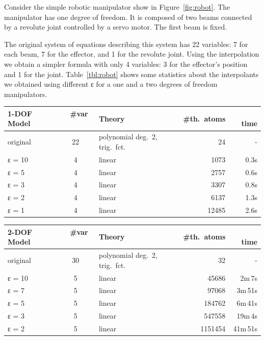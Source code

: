 \begin{example}
Consider the simple robotic manipulator show in Figure~\ref{fig:robot}.
The manipulator has one degree of freedom.
It is composed of two beams connected by a revolute joint controlled by a servo motor.
The first beam is fixed.

The original system of equations describing this system has 22 variables: 7 for each beam, 7 for the effector, and 1 for the revolute joint.
Using the interpolation we obtain a simpler formula with only 4 variables: 3 for the effector's position and 1 for the joint.
Table~\ref{tbl:robot} shows some statistics about the interpolants we obtained using different ε for a one and a two degrees of freedom manipulators.

\begin{table}
\centering
\begin{tabular}{l|clrr}
1-DOF Model & ~ \#var  ~~ & Theory   & \#th.~atoms & ~~ time \\
\hline
\hline
original & 22 & polynomial deg.~2, trig.~fct.   & 24    & - \\
\hline
ε = 10   & 4  & linear                          & 1073  & 0.3s \\
ε = 5    & 4  & linear                          & 2757  & 0.6s \\
ε = 3    & 4  & linear                          & 3307  & 0.8s \\
ε = 2    & 4  & linear                          & 6137  & 1.3s \\
ε = 1    & 4  & linear                          & 12485 & 2.6s \\
\end{tabular}

\vspace{2ex}

\begin{tabular}{l|clrr}
2-DOF Model    & ~ \#var  ~~ & Theory   & \#th.~atoms & ~~ time \\
\hline
\hline
original & 30 & polynomial deg.~2, trig.~fct.   & 32        & - \\
\hline
ε = 10   & 5  & linear                          & 45686     & 2m\,7s \\
ε = 7    & 5  & linear                          & 97068     & 3m\,51s  \\
ε = 5    & 5  & linear                          & 184762    & 6m\,41s  \\
ε = 3    & 5  & linear                          & 547558    & 19m\,4s  \\
ε = 2    & 5  & linear                          & 1151454   & 41m\,51s  \\
\end{tabular}


\end{table}
\end{example}
